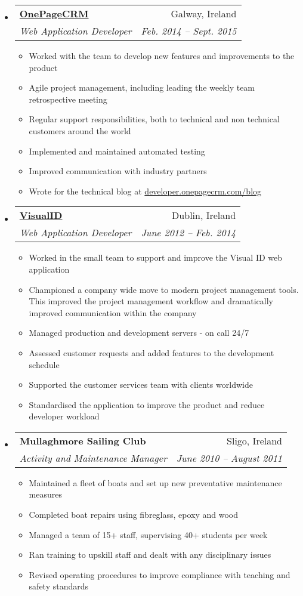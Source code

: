 \documentclass[letterpaper,11pt]{article}
\makeatletter
\newcommand{\resitem}[1]{\item #1 \vspace{-2pt}}
\newcommand{\ressubheading}[4]{
\begin{tabular*}{6.5in}{l@{\extracolsep{\fill}}r}
		\textbf{#1} & #2 \\
		\textit{#3} & \textit{#4} \\
\end{tabular*}\vspace{-6pt}}
\makeatother
\begin{document}
\begin{itemize}
		\item 
			\ressubheading{\href{http://www.onepagecrm.com}{OnePageCRM}}{Galway, Ireland}
				{Web Application Developer}{Feb. 2014 -- Sept. 2015}
				{ 
				\begin{itemize}
					\resitem{Worked with the team to develop new features and improvements to the product}
					\resitem{Agile project management, including leading the weekly team retrospective meeting}
					\resitem{Regular support responsibilities, both to technical and non technical customers around the world}
					\resitem{Implemented and maintained automated testing}
					\resitem{Improved communication with industry partners}
					\resitem{Wrote for the technical blog at \href{http://developer.onepagecrm.com/blog}{developer.onepagecrm.com/blog}}
				\end{itemize}
				}

		  \item 
      \ressubheading{\href{http://visualid.com}{VisualID}}{Dublin, Ireland}{Web Application Developer}{June 2012 -- Feb. 2014}
        { 
        \begin{itemize}
      		\resitem{Worked in the small team to support and improve the Visual ID web application}
      		\resitem{Championed a company wide move to modern project management tools. This improved the project management workflow and dramatically improved communication within the company}
	        \resitem{Managed production and development servers - on call 24/7}
	        \resitem{Assessed customer requests and added features to the development schedule}
	        \resitem{Supported the customer services team with clients worldwide}
	        \resitem{Standardised the application to improve the product and reduce developer workload}
        \end{itemize}
        }
        
        \item
        \ressubheading{Mullaghmore Sailing Club}{Sligo, Ireland}{Activity and Maintenance Manager}{June 2010 -- August 2011}
        {
        \begin{itemize}
        \resitem{Maintained a fleet of boats and set up new preventative maintenance measures}
        \resitem{Completed boat repairs using fibreglass, epoxy and wood}
        \resitem{Managed a team of 15+ staff, supervising 40+ students per week}
        \resitem{Ran training to upskill staff and dealt with any disciplinary issues}
        \resitem{Revised operating procedures to improve compliance with teaching and safety standards}
        \end{itemize}
        }

	\end{itemize}  %
\end{document}
